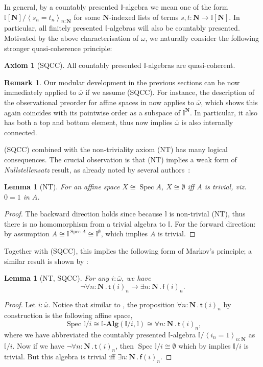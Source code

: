 \documentclass[a4paper,12pt]{amsart}
\newtheorem{lemma}[theorem]{Lemma}
\theoremstyle{definition}
\newtheorem{remark}[theorem]{Remark}
\newtheorem*{axiom}{Axiom}
\newcommand{\mb}[1]{\mathbf{#1}}
\newcommand{\mbb}[1]{\mathbb{#1}}
\newcommand{\I}{\mbb I}
\newcommand{\ms}[1]{\mathsf{#1}}
\newcommand{\alg}{\text{-}\mb{Alg}}
\newcommand{\ov}[1]{\overline{#1}}
\newcommand{\pair}[1]{\left\langle#1\right\rangle}
\newcommand{\N}{\mb N}
\newcommand{\fa}[2]{\forall #1\!\colon\!\!#2\mathpunct{.}}
\newcommand{\ex}[2]{\exists #1\!\colon\!\!#2\mathpunct{.}}
\newcommand{\emp}{\emptyset}
\newcommand{\spec}{\operatorname{Spec}}
\newcommand\istsym{\ms{t}}
\newcommand\isfsym{\ms{f}}
\newcommand\ist[1]{\istsym(#1)}
\newcommand\isf[1]{\isfsym(#1)}
\begin{document}
In general, by a countably presented $\I$-algebra we mean one of the form $\I[\N]/\pair{s_n = t_n}_{n:\N}$ for some $\N$-indexed lists of terms $s,t \colon \N \to \I[\N]$. In particular, all finitely presented $\I$-algebras will also be countably presented. Motivated by the above characterisation of $\ov\omega$, we naturally consider the following stronger quasi-coherence principle:

\begin{axiom}[SQCC]
  All countably presented $\I$-algebras are quasi-coherent.
\end{axiom}

\begin{remark}
  Our modular development in the previous sections can be now immediately applied to $\ov\omega$ if we assume (SQCC). For instance, the description of the observational preorder for affine spaces in  now applies to $\ov\omega$, which shows this again coincides with its pointwise order as a subspace of $\I^\N$. In particular, it also has both a top and bottom element, thus  now implies $\ov\omega$ is also internally connected. 
\end{remark}

(SQCC) combined with the non-triviality axiom (NT) has many logical consequences. The crucial observation is that (NT) implies a weak form of \emph{Nullstellensatz} result, as already noted by several authors~\citep{blechschmidt2021using,blechschmidt2020general,Cherubini_Coquand_Hutzler_2024}:

\begin{lemma}[NT]\label{lem:nulls}
  For an affine space $X \cong \spec A$, $X \cong \emp$ iff $A$ is trivial, viz.\ $0=1$ in $A$.
\end{lemma}
\begin{proof}
  The backward direction holds since because $\I$ is non-trivial (NT), thus there is no homomorphism from a trivial algebra to $\I$. For the forward direction: by assumption $A \cong \I^{\spec A} \cong \I^\emp$, which implies $A$ is trivial. 
\end{proof}

Together with (SQCC), this implies the following form of Markov's principle; a similar result is shown by \citet{cherubini2024foundation}:

\begin{lemma}[NT, SQCC]\label{lem:markov}
  For any $i : \ov\omega$, we have
  \[ \neg\fa{n}{\N}\ist{i}_n \to \ex n\N\isf{i}_n\text{.} \]
\end{lemma}
\begin{proof}
  Let $i : \ov\omega$. Notice that similar to , the proposition $\fa n\N \ist{i}_n$ by construction is the following affine space, 
  \[ \spec\I/i \cong \I\alg(\I/i,\I) \cong \fa n\N \ist{i}_n\text{,} \]
  where we have abbreviated the countably presented $\I$-algebra $\I/\pair{i_n=1}_{n:\N}$ as $\I/i$. Now if we have $\neg\fa n\N \ist{i}_n$, then $\spec\I/i \cong \emp$ which by  implies $\I/i$ is trivial. But this algebra is trivial iff $\ex n\N \isf{i}_n$.
\end{proof}
\end{document}
